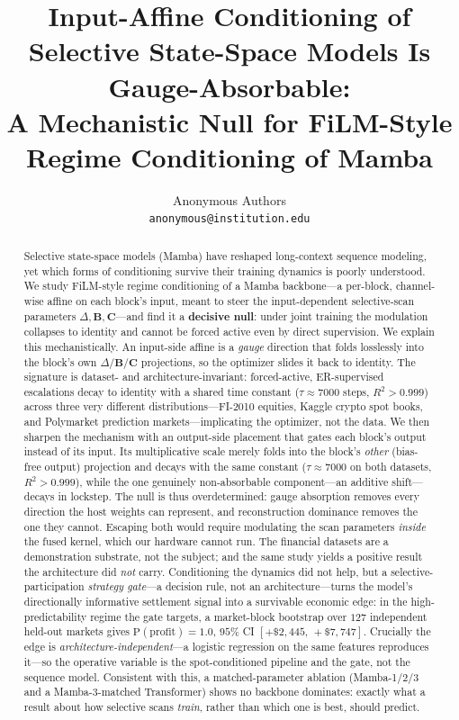 \documentclass{article}
\title{Input-Affine Conditioning of Selective State-Space Models Is Gauge-Absorbable:\\A Mechanistic Null for FiLM-Style Regime Conditioning of Mamba}
\author{
  Anonymous Authors \\
  \texttt{anonymous@institution.edu}
}
\date{}
\begin{document}
\maketitle

\begin{abstract}
Selective state-space models (Mamba) have reshaped long-context sequence
modeling, yet which forms of conditioning survive their training dynamics
is poorly understood.  We study FiLM-style regime conditioning of a Mamba
backbone---a per-block, channel-wise affine on each block's input, meant
to steer the input-dependent selective-scan parameters
$\Delta,\mathbf{B},\mathbf{C}$---and find it a \textbf{decisive null}:
under joint training the modulation collapses to identity and cannot be
forced active even by direct supervision.  We explain this
mechanistically.  An input-side affine is a \emph{gauge} direction that
folds losslessly into the block's own $\Delta/\mathbf{B}/\mathbf{C}$
projections, so the optimizer slides it back to identity.  The signature
is dataset- and architecture-invariant: forced-active, ER-supervised
escalations decay to identity with a shared time constant
($\tau\approx7000$ steps, $R^2>0.999$) across three very different
distributions---FI-2010 equities, Kaggle crypto spot books, and
Polymarket prediction markets---implicating the optimizer, not the data.
We then sharpen the mechanism with an output-side placement that gates
each block's output instead of its input.  Its multiplicative scale merely
folds into the block's \emph{other} (bias-free output) projection and
decays with the same constant ($\tau\approx7000$ on both datasets,
$R^2>0.999$), while the one genuinely non-absorbable component---an additive
shift---decays in lockstep.  The null is thus overdetermined: gauge
absorption removes every direction the host weights can represent, and
reconstruction dominance removes the one they cannot.  Escaping both would
require modulating the scan parameters \emph{inside} the fused kernel, which
our hardware cannot run.
The financial datasets are a demonstration substrate, not the subject; and
the same study yields a positive result the architecture did \emph{not}
carry.  Conditioning the dynamics did not help, but a
selective-participation \emph{strategy gate}---a decision rule, not an
architecture---turns the model's directionally informative settlement
signal into a survivable economic edge: in the high-predictability regime
the gate targets, a market-block bootstrap over $127$ independent held-out
markets gives $\mathrm{P(profit)}{=}1.0$, $95\%$ CI
$[{+}\$2{,}445,\,{+}\$7{,}747]$.  Crucially the edge is
\emph{architecture-independent}---a logistic regression on the same
features reproduces it---so the operative variable is the spot-conditioned
pipeline and the gate, not the sequence model.  Consistent with this, a
matched-parameter ablation (Mamba-1/2/3 and a Mamba-3-matched Transformer)
shows no backbone dominates: exactly what a result about how selective
scans \emph{train}, rather than which one is best, should predict.
\end{abstract}
\end{document}

